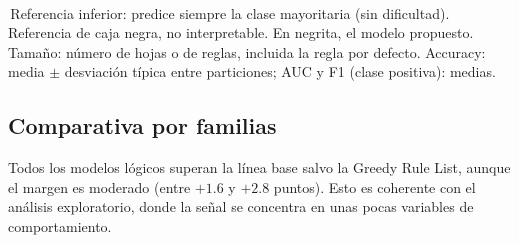 \documentclass[a4paper,11pt]{article}
\begin{document}
\begin{table}[H]
\vspace{0.4em}
\begin{minipage}{\linewidth}
\footnotesize
\textsuperscript{\dag}\,Referencia inferior: predice siempre la clase mayoritaria (sin dificultad).
\textsuperscript{\ddag}\,Referencia de caja negra, no interpretable.
En negrita, el modelo propuesto.
Tamaño: número de hojas o de reglas, incluida la regla por defecto.
Accuracy: media $\pm$ desviación típica entre particiones; AUC y F1 (clase positiva): medias.
\end{minipage}
\caption{Resumen de los estimadores ajustados y su rendimiento en validación cruzada de 5 particiones (mismas particiones para todos los modelos).}
\label{tab:resumenph1}
\end{table}

\subsection{Comparativa por familias}
Todos los modelos lógicos superan la línea base salvo la Greedy Rule List, aunque el margen es moderado (entre $+1.6$ y $+2.8$ puntos). Esto es coherente con el análisis exploratorio, donde la señal se concentra en unas pocas variables de comportamiento.
\end{document}
